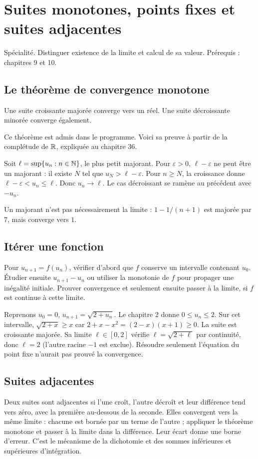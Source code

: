 \documentclass[../cours_tle.tex]{subfiles}
\begin{document}
\setcounter{chapter}{10}
\chapter{Suites monotones, points fixes et suites adjacentes}
\label{ch:11}
\begin{objectif}
Spécialité. Distinguer existence de la limite et calcul de sa valeur. Prérequis : chapitres 9 et 10.
\end{objectif}
\section{Le théorème de convergence monotone}
\begin{theoreme}
Une suite croissante majorée converge vers un réel. Une suite décroissante minorée converge également.
\end{theoreme}
Ce théorème est admis dans le programme. Voici sa preuve à partir de la complétude de $\mathbb{R}$, expliquée au chapitre 36.
\begin{demonstration}
Soit $\ell=\sup\{u_n:n\in\mathbb{N}\}$, le plus petit majorant. Pour $\varepsilon>0$, $\ell-\varepsilon$ ne peut être un majorant : il existe $N$ tel que $u_N>\ell-\varepsilon$.
Pour $n\ge N$, la croissance donne $\ell-\varepsilon<u_n\le\ell$. Donc $u_n\to\ell$.
Le cas décroissant se ramène au précédent avec $-u_n$.
\end{demonstration}
Un majorant n'est pas nécessairement la limite : $1-1/(n+1)$ est majorée par $7$, mais converge vers $1$.
\section{Itérer une fonction}
Pour $u_{n+1}=f(u_n)$, vérifier d'abord que $f$ conserve un intervalle contenant $u_0$. Étudier ensuite $u_{n+1}-u_n$ ou utiliser la monotonie de $f$ pour propager une inégalité initiale. Prouver convergence et seulement ensuite passer à la limite, si $f$ est continue à cette limite.
\begin{exemple}
Reprenons $u_0=0$, $u_{n+1}=\sqrt{2+u_n}$. Le chapitre 2 donne $0\le u_n\le2$. Sur cet intervalle,
$\sqrt{2+x}\ge x$ car $2+x-x^2=(2-x)(x+1)\ge0$.
La suite est croissante majorée. Sa limite $\ell\in[0,2]$ vérifie $\ell=\sqrt{2+\ell}$ par continuité, donc $\ell=2$ (l'autre racine $-1$ est exclue).
Résoudre seulement l'équation du point fixe n'aurait pas prouvé la convergence.
\end{exemple}
\section{Suites adjacentes}
Deux suites sont adjacentes si l'une croît, l'autre décroît et leur différence tend vers zéro, avec la première au-dessous de la seconde.
Elles convergent vers la même limite : chacune est bornée par un terme de l'autre ; appliquer le théorème monotone et passer à la limite dans la différence.
Leur écart donne une borne d'erreur. C'est le mécanisme de la dichotomie et des sommes inférieures et supérieures d'intégration.
\end{document}
